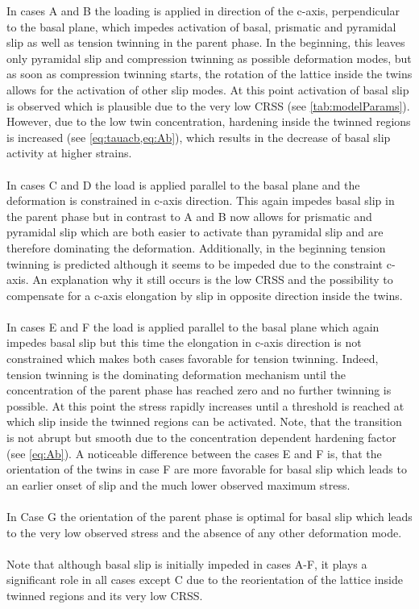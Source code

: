   
  In cases A and B the loading is applied in direction of the c-axis, perpendicular to the basal plane, which impedes activation of basal, prismatic and pyramidal \pyra slip as well as tension twinning in the parent phase. In the beginning, this leaves only pyramidal \pyrac slip and compression twinning as possible deformation modes, but as soon as compression twinning starts, the rotation of the lattice inside the twins allows for the activation of other slip modes. At this point activation of basal slip is observed which is plausible due to the very low CRSS (see \cref{tab:modelParams}). However, due to the low twin concentration, hardening inside the twinned regions is increased (see \cref{eq:tauacb,eq:Ab}), which results in the decrease of basal slip activity at higher strains. \\ \\
  In cases C and D the load is applied parallel to the basal plane and the deformation is constrained in c-axis direction. This again impedes basal slip in the parent phase but in contrast to A and B now allows for prismatic and pyramidal \pyra slip which are both easier to activate than pyramidal \pyrac slip and are therefore dominating the deformation. Additionally, in the beginning tension twinning is predicted although it seems to be impeded due to the constraint c-axis. An explanation why it still occurs is the low CRSS and the possibility to compensate for a c-axis elongation by slip in opposite direction inside the twins.\\ \\ 
  In cases E and F the load is applied parallel to the basal plane which again impedes basal slip but this time the elongation in c-axis direction is not constrained which makes both cases favorable for tension twinning. Indeed, tension twinning is the dominating deformation mechanism until the concentration of the parent phase has reached zero and no further twinning is possible. At this point the stress rapidly increases until a threshold is reached at which slip inside the twinned regions can be activated. Note, that the transition is not abrupt but smooth due to the concentration dependent hardening factor (see \cref{eq:Ab}). A noticeable difference between the cases E and F is, that the orientation of the twins in case F are more favorable for basal slip which leads to an earlier onset of slip and the much lower observed maximum stress. \\ \\
  In Case G the orientation of the parent phase is optimal for basal slip which leads to the very low observed stress and the absence of any other deformation mode. \\ \\
  Note that although basal slip is initially impeded in cases A-F, it plays a significant role in all cases except C due to the reorientation of the lattice inside twinned regions and its very low CRSS.
  
